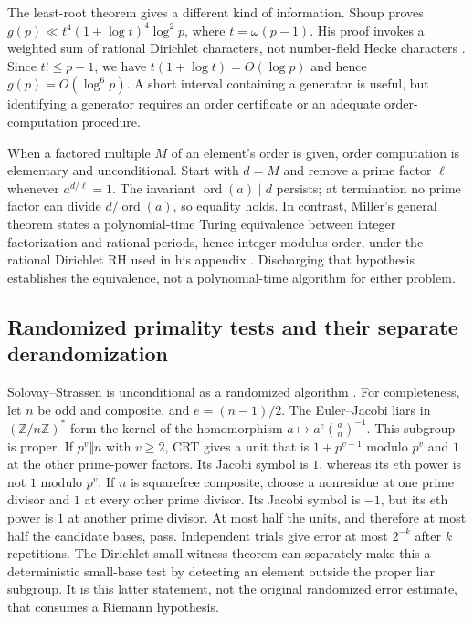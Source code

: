\documentclass[11pt]{article}
\newcommand{\Z}{\mathbb Z}
\newcommand{\ord}{\operatorname{ord}}
\theoremstyle{definition}
\theoremstyle{remark}
\begin{document}
The least-root theorem gives a different kind of information. Shoup proves
$g(p)\ll t^4(1+\log t)^4\log^2p$, where $t=\omega(p-1)$.
His proof invokes a weighted sum of rational Dirichlet characters, not
number-field Hecke characters \citep[Theorem~3, author p.~4;
Proposition~9, p.~10; Section~6, p.~13]{Shoup1992}.
Since $t!\le p-1$, we have $t(1+\log t)=O(\log p)$ and hence
$g(p)=O(\log^6p)$. A short interval containing a generator is useful,
but identifying a generator requires an order certificate or an adequate
order-computation procedure.

When a factored multiple $M$ of an element's order is given, order
computation is elementary and unconditional. Start with $d=M$ and remove
a prime factor $\ell$ whenever $a^{d/\ell}=1$. The invariant
$\ord(a)\mid d$ persists; at termination no prime factor can divide
$d/\ord(a)$, so equality holds. In contrast, Miller's general theorem
states a polynomial-time Turing equivalence between integer factorization
and rational periods, hence integer-modulus order, under the rational
Dirichlet RH used in his appendix
\citep[Theorem~4, pp.~311--312; pp.~315--316]{Miller1976}.
Discharging that hypothesis establishes the equivalence, not a
polynomial-time algorithm for either problem.

\subsection{Randomized primality tests and their separate derandomization}

Solovay--Strassen is unconditional as a randomized algorithm
\citep{SolovayStrassen1977}. For completeness, let $n$ be odd and composite, and
$e=(n-1)/2$. The Euler--Jacobi liars in $(\Z/n\Z)^*$ form the kernel of
the homomorphism $a\mapsto a^e\left(\frac an\right)^{-1}$.
This subgroup is proper. If $p^v\Vert n$ with $v\ge2$, CRT gives a unit
that is $1+p^{v-1}$ modulo $p^v$ and $1$ at the other prime-power factors.
Its Jacobi symbol is $1$, whereas its $e$th power is not $1$ modulo $p^v$.
If $n$ is squarefree composite, choose a nonresidue at one prime divisor
and $1$ at every other prime divisor. Its Jacobi symbol is $-1$, but its
$e$th power is $1$ at another prime divisor. At most half the units,
and therefore at most half the candidate bases, pass. Independent trials
give error at most $2^{-k}$ after $k$ repetitions.
The Dirichlet small-witness theorem can separately make this a
deterministic small-base test by detecting an element outside the proper
liar subgroup. It is this latter statement, not the original randomized
error estimate, that consumes a Riemann hypothesis.
\end{document}
